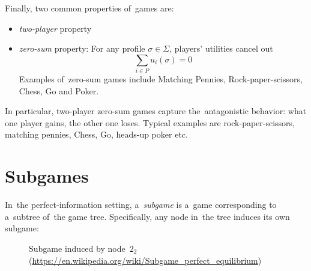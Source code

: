 Finally, two common properties of~games are:
\begin{itemize}
  \item \emph{two-player} property
  \item \emph{zero-sum} property:
    For any profile $\sigma \in \Sigma$, players' utilities cancel out
    \[ \sum _{i \in P} u _i (\sigma) = 0 \]
    Examples of~zero-sum games include Matching Pennies, Rock-paper-scissors, Chess, Go and Poker.
\end{itemize}
In particular, two-player zero-sum games capture the~antagonistic behavior:
what one player gains, the other one loses.
Typical examples are rock-paper-scissors, matching pennies, Chess, Go, heads-up poker etc.

\section{Subgames}
In~the perfect-information setting, a~\emph{subgame} is a~game corresponding to a~subtree of~the game tree.
Specifically, any node in~the tree induces its own subgame:
\begin{figure}[H]
  \centering
  \scriptsize
  \def\svgwidth{.7\textwidth}
  
  \def\captionTitle{Subgame induced by node~$2_2$}
  \caption[\captionTitle]{\captionTitle{}\\ (\href{https://en.wikipedia.org/wiki/Subgame_perfect_equilibrium}{https://en.wikipedia.org/wiki/Subgame\_perfect\_equilibrium})}
  \label{fig:ext-form-subgame}
\end{figure}


